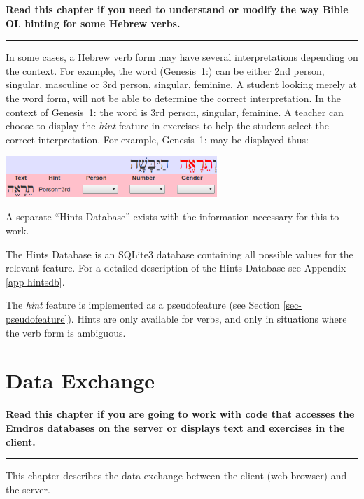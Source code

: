 \documentclass[11pt,oneside,a4paper]{memoir}
\newcommand*{\bibleref}[3]{#1~#2\thinspace:\thinspace#3}
\newcommand{\heb}[1]{{\RL {\ezr #1}}}
\begin{document}
\textbf{Read this chapter if you need to understand or modify the way Bible OL hinting for some
  Hebrew verbs.}
\plainbreak{3}


In some cases, a Hebrew verb form may have several interpretations depending on the context. For
example, the word \heb{תֵרָאֶה} (\bibleref{Genesis}{1}{9}) can be either 2nd person, singular,
masculine or 3rd person, singular, feminine. A student looking merely at the word form, will not be
able to determine the correct interpretation. In the context of \bibleref{Genesis}{1}{9} the word is
3rd person, singular, feminine. A teacher can choose to display the \emph{hint} feature in exercises
to help the student select the correct interpretation. For example, \bibleref{Genesis}{1}{9} may be
displayed thus:

\begin{center}
  \includegraphics[width=0.6\textwidth]{hint.png}
\end{center}

A separate ``Hints Database'' exists with the information necessary
for this to work.

The Hints Database is an SQLite3 database containing all possible values for the
relevant feature. For a detailed description of the Hints Database see Appendix \ref{app-hintsdb}.

The \emph{hint} feature is implemented as a pseudofeature (see Section \ref{sec-pseudofeature}).
Hints are only available for verbs, and only in situations where the verb form is ambiguous.


\chapter{Data Exchange}\label{chap-data-exchange}

\textbf{Read this chapter if you are going to work with code that accesses the Emdros databases on
  the server or displays text and exercises in the client.}
\plainbreak{3}

This chapter describes the data exchange between the client (web browser)
and the server.
\end{document}
